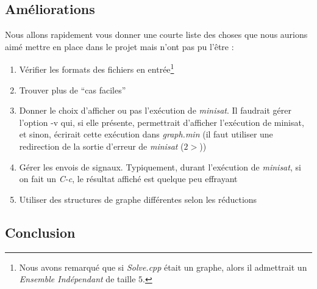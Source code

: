   \subsection{Améliorations}
  Nous allons rapidement vous donner une courte liste des choses que
  nous aurions aimé mettre en place dans le projet mais n'ont pas pu
  l'être :
  \begin{enumerate}
   \item Vérifier les formats des fichiers en entrée\footnote{Nous avons
	 remarqué que si \emph{Solve.cpp} était un graphe, alors il
	 admettrait un \emph{Ensemble Indépendant} de taille $5$.} 
   \item Trouver plus de ``cas faciles''
   \item Donner le choix d'afficher ou pas l'exécution de
	 \emph{minisat}. Il faudrait gérer l'option -v qui, si elle
	 présente, permettrait d'afficher l'exécution de minisat, et
	 sinon, écrirait cette exécution dans \emph{graph.min} (il faut
	 utiliser une redirection de la sortie d'erreur de
	 \emph{minisat} ($2>$))
   \item Gérer les envois de signaux. Typiquement, durant l'exécution de
	 \emph{minisat}, si on fait un \emph{C-c}, le résultat affiché
	 est quelque peu effrayant
   \item Utiliser des structures de graphe différentes selon les
	 réductions
  \end{enumerate}
  
  \subsection{Conclusion}
  